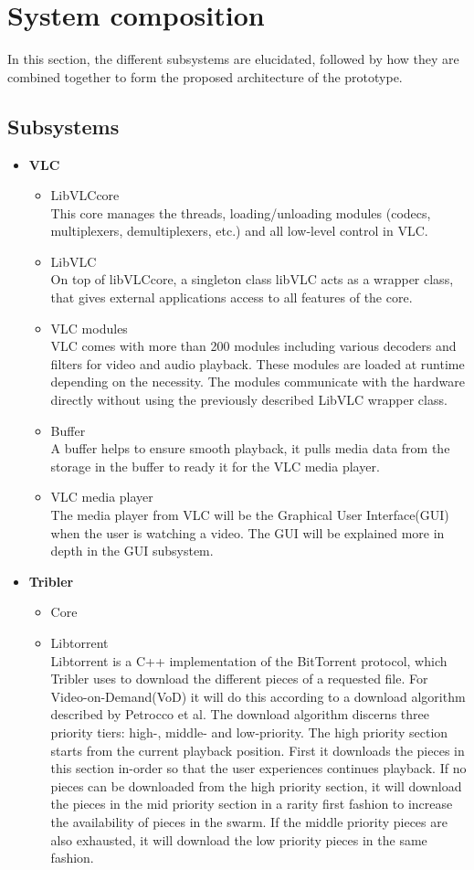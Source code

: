 \section{System composition}
In this section, the different subsystems are elucidated, followed by how they are combined together to form the proposed architecture of the prototype.
\subsection{Subsystems}
\begin{itemize}
\item \textbf{VLC}
	\begin{itemize}
		\item LibVLCcore\\
This core manages the threads, loading/unloading modules (codecs, multiplexers, demultiplexers, etc.) and all low-level control in VLC.
		\item LibVLC\\
On top of libVLCcore, a singleton class libVLC acts as a wrapper class, that gives external applications access to all features of the core.
		\item VLC modules\\
VLC comes with more than 200 modules including various decoders and filters for video and audio playback. These modules are loaded at runtime depending on the necessity. The modules communicate with the hardware directly without using the previously described LibVLC wrapper class.
		\item Buffer\\
A buffer helps to ensure smooth playback, it pulls media data from the storage in the buffer to ready it for the VLC media player.
		\item VLC media player\\
The media player from VLC will be the Graphical User Interface(GUI) when the user is watching a video. The GUI will be explained more in depth in the GUI subsystem.
	\end{itemize}
\item \textbf{Tribler}
	\begin{itemize}
		\item Core\\
		\item Libtorrent\\
Libtorrent is a C++ implementation of the BitTorrent protocol, which Tribler uses to download the different pieces of a requested file. For Video-on-Demand(VoD) it will do this according to a download algorithm described by Petrocco et al\cite{libswift12}. The download algorithm discerns three priority tiers: high-, middle- and low-priority. The high priority section starts from the current playback position. First it downloads the pieces in this section in-order so that the user experiences continues playback. If no pieces can be downloaded from the high priority section, it will download the pieces in the mid priority section in a rarity first fashion to increase the availability of pieces in the swarm. If the middle priority pieces are also exhausted, it will download the low priority pieces in the same fashion. 

\end{itemize}
\end{itemize}
